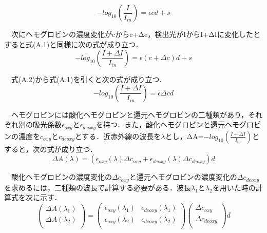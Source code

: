 \documentclass[a4j,12pt]{jreport}
\begin{document}
\begin{equation}
-log_{10}(\frac{I}{I_{in}}) = \epsilon cd+s	
\end{equation}

　次にヘモグロビンの濃度変化がcからc+Δc，検出光がIからI+ΔIに変化したとすると式(A.1)と同様に次の式が成り立つ．\\

\begin{equation}
-log_{10}(\frac{I+ΔI}{I_{in}}) = \epsilon (c+Δc)d+s 	
\end{equation}			

　式(A.2)から式(A.1)を引くと次の式が成り立つ．\\

\begin{equation}
-log_{10}(\frac{I+ΔI}{I_{in}}) = \epsilon Δcd 
\end{equation}			

　ヘモグロビンには酸化ヘモグロビンと還元ヘモグロビンの二種類があり，それぞれ別の吸光係数$\epsilon_{oxy}$と$\epsilon_{deoxy}$を持つ．また，酸化ヘモグロビンと還元ヘモグロビンの濃度を$c_{oxy}$と$c_{deoxy}$とする．近赤外線の波長を$\lambda$とし，ΔA=$-log_{10}(\frac{I+ΔI}{I_{in}})$とすると，次の式が成り立つ．\\

\begin{equation}
ΔA(\lambda)=(\epsilon_{oxy}(\lambda)Δc_{oxy}+\epsilon_{deoxy}(\lambda)Δc_{deoxy})d 			
\end{equation}

　酸化ヘモグロビンの濃度変化の$Δc_{oxy}$と還元ヘモグロビンの濃度変化の$Δc_{deoxy}$を求めるには，二種類の波長で計算する必要がある．波長$\lambda_1$と$\lambda_2$を用いた時の計算式を次に示す．\\

\begin{equation}
\left(\begin{array}{c} ΔA(\lambda_1) \\ ΔA(\lambda_2) \\ \end{array}\right)=\left(\begin{array}{cc} \epsilon_{oxy}(\lambda_1) & \epsilon_{deoxy}(\lambda_1) \\ \epsilon_{oxy}(\lambda_2) & \epsilon_{deoxy}(\lambda_2) \\ \end{array}\right)\left(\begin{array}{c} Δc_{oxy} \\ Δc_{deoxy} \\ \end{array}\right)d
\end{equation}
\end{document}
